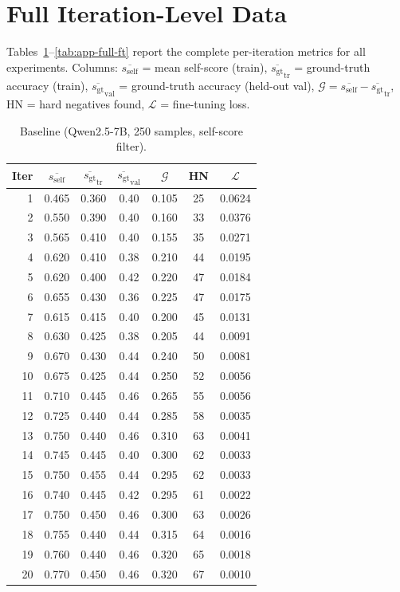 \documentclass{article}
\newcommand{\gap}{\mathcal{G}}          %
\newcommand{\self}{s_{\text{self}}}     %
\newcommand{\gt}{s_{\text{gt}}}         %
\begin{document}



\appendix
\section{Full Iteration-Level Data}
\label{app:full-data}

Tables~\ref{tab:app-baseline}--\ref{tab:app-full-ft} report the complete
per-iteration metrics for all experiments.
Columns: $\overline{\self}$ = mean self-score (train), $\overline{\gt}_\text{tr}$ = ground-truth
accuracy (train), $\overline{\gt}_\text{val}$ = ground-truth accuracy (held-out val),
$\gap = \overline{\self} - \overline{\gt}_\text{tr}$, HN = hard negatives found,
$\mathcal{L}$ = fine-tuning loss.

\begin{table}[h]
\centering
\caption{Baseline (Qwen2.5-7B, 250 samples, self-score filter).}
\label{tab:app-baseline}
\small
\begin{tabular}{rcccccc}
\toprule
Iter & $\overline{\self}$ & $\overline{\gt}_\text{tr}$ & $\overline{\gt}_\text{val}$ & $\gap$ & HN & $\mathcal{L}$ \\
\midrule
1  & 0.465 & 0.360 & 0.40 & 0.105 & 25  & 0.0624 \\
2  & 0.550 & 0.390 & 0.40 & 0.160 & 33  & 0.0376 \\
3  & 0.565 & 0.410 & 0.40 & 0.155 & 35  & 0.0271 \\
4  & 0.620 & 0.410 & 0.38 & 0.210 & 44  & 0.0195 \\
5  & 0.620 & 0.400 & 0.42 & 0.220 & 47  & 0.0184 \\
6  & 0.655 & 0.430 & 0.36 & 0.225 & 47  & 0.0175 \\
7  & 0.615 & 0.415 & 0.40 & 0.200 & 45  & 0.0131 \\
8  & 0.630 & 0.425 & 0.38 & 0.205 & 44  & 0.0091 \\
9  & 0.670 & 0.430 & 0.44 & 0.240 & 50  & 0.0081 \\
10 & 0.675 & 0.425 & 0.44 & 0.250 & 52  & 0.0056 \\
11 & 0.710 & 0.445 & 0.46 & 0.265 & 55  & 0.0056 \\
12 & 0.725 & 0.440 & 0.44 & 0.285 & 58  & 0.0035 \\
13 & 0.750 & 0.440 & 0.46 & 0.310 & 63  & 0.0041 \\
14 & 0.745 & 0.445 & 0.40 & 0.300 & 62  & 0.0033 \\
15 & 0.750 & 0.455 & 0.44 & 0.295 & 62  & 0.0033 \\
16 & 0.740 & 0.445 & 0.42 & 0.295 & 61  & 0.0022 \\
17 & 0.750 & 0.450 & 0.46 & 0.300 & 63  & 0.0026 \\
18 & 0.755 & 0.440 & 0.44 & 0.315 & 64  & 0.0016 \\
19 & 0.760 & 0.440 & 0.46 & 0.320 & 65  & 0.0018 \\
20 & 0.770 & 0.450 & 0.46 & 0.320 & 67  & 0.0010 \\
\bottomrule
\end{tabular}
\end{table}
\end{document}
